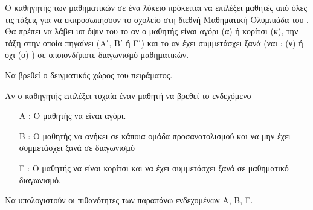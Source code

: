 Ο καθηγητής των μαθηματικών σε ένα λύκειο πρόκειται να επιλέξει μαθητές από όλες τις τάξεις για να εκπροσωπήσουν το σχολείο στη διεθνή Μαθηματική Ολυμπιάδα του \the\year{}. Θα πρέπει να λάβει υπ όψιν του το αν ο μαθητής είναι αγόρι (α) ή κορίτσι (κ), την τάξη στην οποία πηγαίνει (Α΄, Β΄ ή Γ΄) και το αν έχει συμμετάσχει ξανά (ναι : (ν) ή όχι (ο) ) σε οποιονδήποτε διαγωνισμό μαθηματικών.
\begin{rlist}
\item Να βρεθεί ο δειγματικός χώρος του πειράματος.
\item Αν ο καθηγητής επιλέξει τυχαία έναν μαθητή να βρεθεί το ενδεχόμενο
\begin{enumerate}[itemsep=0mm]
\item[Α :] Ο μαθητής να είναι αγόρι.
\item[Β :] Ο μαθητής να ανήκει σε κάποια ομάδα προσανατολισμού και να μην έχει συμμετάσχει ξανά σε διαγωνισμό
\item[Γ :] Ο μαθητής να είναι κορίτσι και να έχει συμμετάσχει ξανά σε μαθηματικό διαγωνισμό.
\end{enumerate}
\item Να υπολογιστούν οι πιθανότητες των παραπάνω ενδεχομένων Α, Β, Γ.
\end{rlist}
